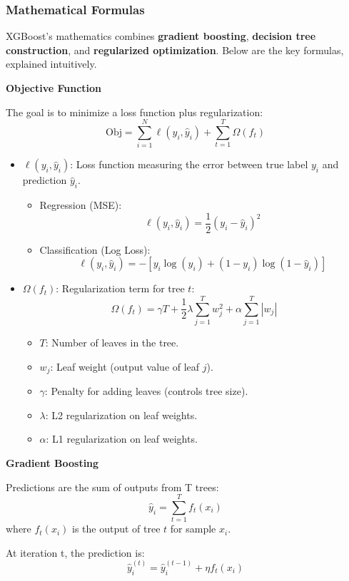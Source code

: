 \subsubsection{Mathematical Formulas}

XGBoost's mathematics combines \textbf{gradient boosting}, \textbf{decision tree construction}, and \textbf{regularized optimization}.
Below are the key formulas, explained intuitively.

\smallskip
\textbf{Objective Function}

The goal is to minimize a loss function plus regularization:
\[\text{Obj} = \sum_{i=1}^N \ell(y_i, \hat{y}_i) + \sum_{t=1}^T \Omega(f_t)\]

\begin{itemize}
    \item $\ell(y_i, \hat{y}_i)$: Loss function measuring the error between true label $y_i$ and prediction $\hat{y}_i$.
    \begin{itemize}
        \item Regression (MSE):
            \[\ell(y_i, \hat{y}_i) = \frac{1}{2}(y_i - \hat{y}_i)^2\]
        \item Classification (Log Loss):
            \[\ell(y_i, \hat{y}_i) = -[y_i \log(\hat{y}_i) + (1 - y_i) \log(1 - \hat{y}_i)]\]
    \end{itemize}

    \item $\Omega(f_t)$: Regularization term for tree $t$:
    \[\Omega(f_t) = \gamma T + \frac{1}{2}\lambda \sum_{j=1}^T w_j^2 + \alpha \sum_{j=1}^T |w_j|\]
    \begin{itemize}
        \item $T$: Number of leaves in the tree.
        \item $w_j$: Leaf weight (output value of leaf $j$).
        \item $\gamma$: Penalty for adding leaves (controls tree size).
        \item $\lambda$: L2 regularization on leaf weights.
        \item $\alpha$: L1 regularization on leaf weights.
    \end{itemize}
\end{itemize}

\smallskip
\textbf{Gradient Boosting}

Predictions are the sum of outputs from T trees:
\[\hat{y}_i = \sum_{t=1}^T f_t(x_i)\]
where $f_t(x_i)$ is the output of tree $t$ for sample $x_i$.

At iteration t, the prediction is:
\[\hat{y}_i^{(t)} = \hat{y}_i^{(t-1)} + \eta f_t(x_i)\]

